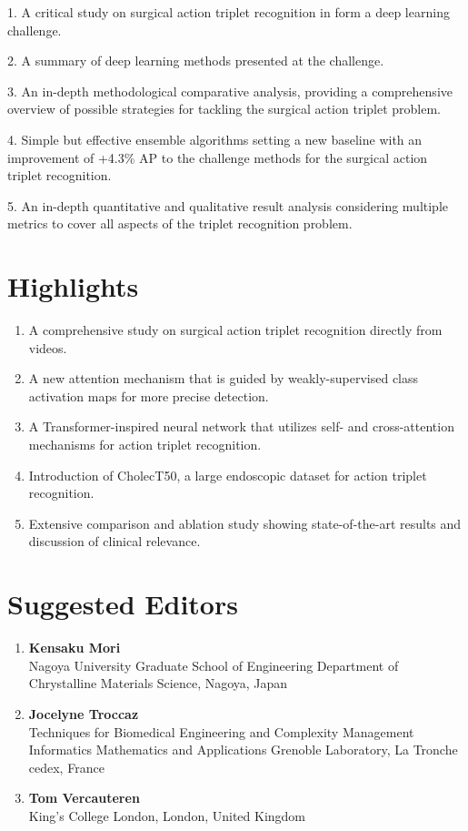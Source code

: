 

1. A critical study on surgical action triplet recognition in form a deep learning challenge.

2. A summary of deep learning methods presented at the challenge.

3. An in-depth methodological comparative analysis, providing a comprehensive overview of possible strategies for tackling the surgical action triplet problem.

4. Simple but effective ensemble algorithms setting a new baseline with an improvement of +4.3\% AP to the challenge methods for the surgical action triplet recognition.

5. An in-depth quantitative and qualitative result analysis considering multiple metrics to cover all aspects of the triplet recognition problem.



\onecolumn
\section*{Highlights}


\begin{enumerate}
    \item A comprehensive study on surgical action triplet recognition directly from videos.
    \item A new attention mechanism that is guided by weakly-supervised class activation maps for more precise detection.
    \item A Transformer-inspired neural network that utilizes self- and cross-attention {\red mechanisms} for action triplet recognition.
    \item Introduction of CholecT50, a large endoscopic dataset for action triplet recognition.
    \item Extensive comparison and ablation study showing state-of-the-art results and discussion of clinical relevance.
\end{enumerate}

\thispagestyle{empty}


\newpage
\section*{Suggested Editors}
\begin{enumerate}
    \item \textbf{Kensaku Mori}\\ Nagoya University Graduate School of Engineering Department of Chrystalline Materials Science, Nagoya, Japan
    \item \textbf{Jocelyne Troccaz}\\Techniques for Biomedical Engineering and Complexity Management Informatics Mathematics and Applications Grenoble Laboratory, La Tronche cedex, France
    \item \textbf{Tom Vercauteren} \\ King's College London, London, United Kingdom
    
    
\end{enumerate}



